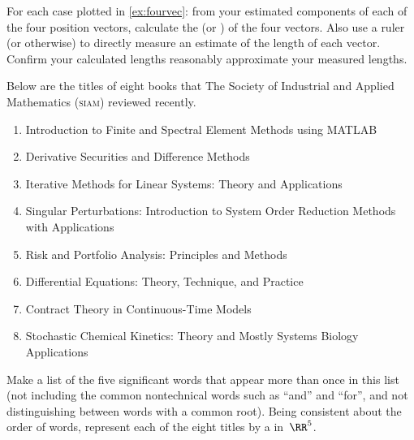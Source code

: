 \begin{exercise} \label{ex:} 
For each case plotted in \autoref{ex:fourvec}:
from your estimated components of each of the four position vectors, calculate the  (or ) of the four vectors. 
Also use a ruler (or otherwise) to directly measure an estimate of the length of each vector.
Confirm your calculated lengths reasonably approximate your measured lengths.
\end{exercise}



\begin{exercise} \label{ex:8siambks} 
Below are the titles of eight books that The Society of Industrial and Applied Mathematics (\textsc{siam}) reviewed recently.
\begin{enumerate}
\item Introduction to Finite and Spectral Element Methods using MATLAB
\item Derivative Securities and Difference Methods 
\item Iterative Methods for Linear Systems: Theory and Applications 
\item Singular Perturbations: Introduction to System Order Reduction Methods with Applications 
\item Risk and Portfolio Analysis: Principles and Methods 
\item Differential Equations: Theory, Technique, and Practice 
\item Contract Theory in Continuous-Time Models 
\item Stochastic Chemical Kinetics: Theory and Mostly Systems Biology Applications
\end{enumerate}
Make a list of the five significant words that appear more than once in this list (not including the common nontechnical words such as ``and'' and ``for'', and not distinguishing between words with a common root).
Being consistent about the order of words, represent each of the eight titles by a  in~\(\RR^5\).

\end{exercise}





